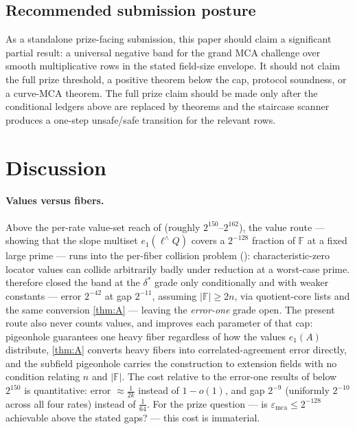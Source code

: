 \documentclass[11pt]{article}
\theoremstyle{definition}
\theoremstyle{remark}
\newcommand{\F}{\mathbb{F}}
\newcommand{\emca}{\varepsilon_{\mathrm{mca}}}
\newcommand{\eone}{e_1}
\begin{document}
\subsection{Recommended submission posture}

As a standalone prize-facing submission, this paper should claim a significant
partial result: a universal negative band for the grand MCA challenge over
smooth multiplicative rows in the stated field-size envelope.  It should not
claim the full prize threshold, a positive theorem below the cap, protocol
soundness, or a curve-MCA theorem.  The full prize claim should be made only
after the conditional ledgers above are replaced by theorems and the staircase
scanner produces a one-step unsafe/safe transition for the relevant rows.


\section{Discussion}\label{sec:discussion}

\paragraph{Values versus fibers.}
Above the per-rate value-set reach of \cite{Cho26b} (roughly $2^{150}$--$2^{162}$), the value route --- showing that the slope multiset $\eone(\ell^\wedge Q)$ covers a $2^{-128}$ fraction of $\F$ at a fixed large prime --- runs into the per-fiber collision problem (\cite[Rem.\ ``The remaining band'']{Cho26b}): characteristic-zero locator values can collide arbitrarily badly under reduction at a worst-case prime. \cite{Cho26b} therefore closed the band at the $\delta^*$ grade only conditionally and with weaker constants --- error $2^{-42}$ at gap $2^{-11}$, assuming $|\F|\ge2n$, via quotient-core lists and the same conversion \cref{thm:A} --- leaving the \emph{error-one} grade open. The present route also never counts values, and improves each parameter of that cap: pigeonhole guarantees one heavy fiber regardless of how the values $\eone(A)$ distribute, \cref{thm:A} converts heavy fibers into correlated-agreement error directly, and the subfield pigeonhole carries the construction to extension fields with no condition relating $n$ and $|\F|$. The cost relative to the error-one results of \cite{Cho26a,Cho26b} below $2^{150}$ is quantitative: error $\approx\frac1{2k}$ instead of $1-o(1)$, and gap $2^{-9}$ (uniformly $2^{-10}$ across all four rates) instead of $\frac1{64}$. For the prize question --- is $\emca\le2^{-128}$ achievable above the stated gaps? --- this cost is immaterial.
\end{document}
